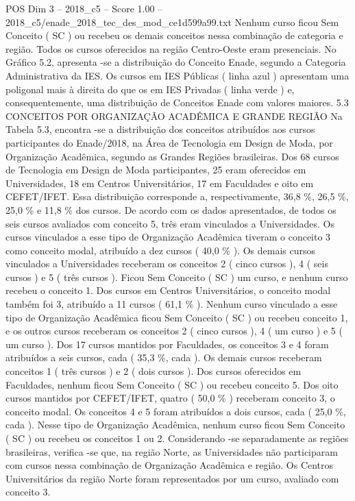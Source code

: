 \begin{textsample}{POS Dim 3 – 2018\_c5 – Score 1.00 – 2018\_c5/enade\_2018\_tec\_des\_mod\_ce1d599a99.txt}
Nenhum curso ficou Sem Conceito ( SC ) ou recebeu os demais conceitos nessa combinação de categoria e região.
Todos os cursos oferecidos na região Centro-Oeste eram presenciais.
No Gráfico 5.2, apresenta -se a distribuição do Conceito Enade, segundo a Categoria Administrativa da IES.
Os cursos em IES Públicas ( linha azul ) apresentam uma poligonal mais à direita do que os em IES Privadas ( linha verde ) e, consequentemente, uma distribuição de Conceitos Enade com valores maiores. 5.3 CONCEITOS POR ORGANIZAÇÃO ACADÊMICA E GRANDE REGIÃO Na Tabela 5.3, encontra -se a distribuição dos conceitos atribuídos aos cursos participantes do Enade/2018, na Área de Tecnologia em Design de Moda, por Organização Acadêmica, segundo as Grandes Regiões brasileiras.
Dos 68 cursos de Tecnologia em Design de Moda participantes, 25 eram oferecidos em Universidades, 18 em Centros Universitários, 17 em Faculdades e oito em CEFET/IFET.
Essa distribuição corresponde a, respectivamente, 36,8 \%, 26,5 \%, 25,0 \% e 11,8 \% dos cursos.
De acordo com os dados apresentados, de todos os seis cursos avaliados com conceito 5, três eram vinculados a Universidades.
Os cursos vinculados a esse tipo de Organização Acadêmica tiveram o conceito 3 como conceito modal, atribuído a dez cursos ( 40,0 \% ).
Os demais cursos vinculados a Universidades receberam os conceitos 2 ( cinco cursos ), 4 ( seis cursos ) e 5 ( três cursos ).
Ficou Sem Conceito ( SC ) um curso, e nenhum curso recebeu o conceito 1.
Dos cursos em Centros Universitários, o conceito modal também foi 3, atribuído a 11 cursos ( 61,1 \% ).
Nenhum curso vinculado a esse tipo de Organização Acadêmica ficou Sem Conceito ( SC ) ou recebeu conceito 1, e os outros cursos receberam os conceitos 2 ( cinco cursos ), 4 ( um curso ) e 5 ( um curso ).
Dos 17 cursos mantidos por Faculdades, os conceitos 3 e 4 foram atribuídos a seis cursos, cada ( 35,3 \%, cada ).
Os demais cursos receberam conceitos 1 ( três cursos ) e 2 ( dois cursos ).
Dos cursos oferecidos em Faculdades, nenhum ficou Sem Conceito ( SC ) ou recebeu conceito 5.
Dos oito cursos mantidos por CEFET/IFET, quatro ( 50,0 \% ) receberam conceito 3, o conceito modal.
Os conceitos 4 e 5 foram atribuídos a dois cursos, cada ( 25,0 \%, cada ).
Nesse tipo de Organização Acadêmica, nenhum curso ficou Sem Conceito ( SC ) ou recebeu os conceitos 1 ou 2.
Considerando -se separadamente as regiões brasileiras, verifica -se que, na região Norte, as Universidades não participaram com cursos nessa combinação de Organização Acadêmica e região.
Os Centros Universitários da região Norte foram representados por um curso, avaliado com conceito 3.

\end{textsample}
